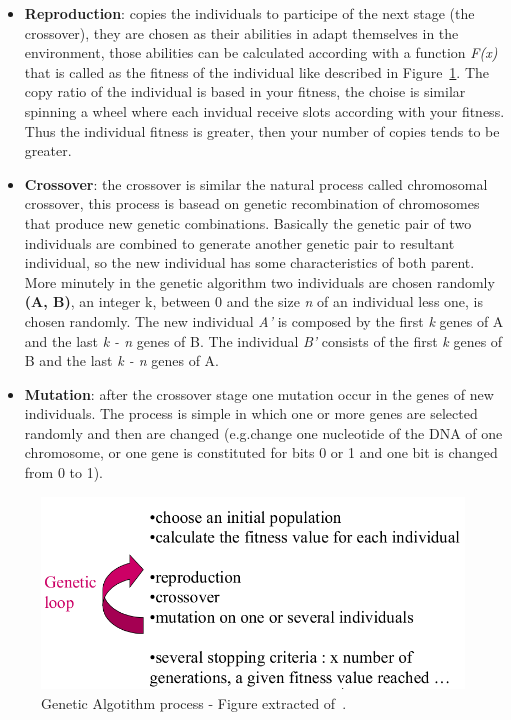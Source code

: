 \begin{itemize}
	\item \textbf{Reproduction}: copies the individuals to participe of the next
	stage (the crossover), they are chosen as their abilities in adapt themselves
	in the environment, those abilities can be calculated according with a function
	\textit{F(x)} that is called as the fitness of the individual like described
	in Figure~\ref{fig:ga}. The copy ratio of the individual is based in your fitness,
	the choise is similar spinning a wheel where each invidual receive slots according
	with your fitness. Thus the individual fitness is greater, then your number
	of copies tends to be greater.

	\item \textbf{Crossover}: the crossover is similar the natural process called
	chromosomal crossover, this process is basead on genetic recombination of
	chromosomes	that produce new genetic combinations. Basically the genetic pair
	of two individuals are combined to generate another genetic pair to resultant
	individual, so the new individual has some characteristics of both parent.
	More minutely in the genetic algorithm two individuals are chosen randomly {\bf(A, B)},
	an integer k, between 0 and the size {\it n} of an individual less one, is chosen
	randomly. The new individual {\it A'} is composed by the first {\it k} genes of A
	and the last {\it k - n} genes of B. The individual {\it B'} consists of the
	first {\it k} genes of B and the last {\it k - n} genes of A. 

	\item \textbf{Mutation}: after the crossover stage one mutation occur in the
	genes of new individuals. The process is simple in which one or more genes are
	selected randomly and then are changed (e.g.change one nucleotide of the DNA
	of one chromosome, or one gene is constituted for bits 0 or 1 and one bit is
	changed from 0 to 1).
\end{itemize}

\begin{figure}[htbp]
	\centering
	\includegraphics[width=\columnwidth]{img/ga.png}
	\caption{Genetic Algotithm process - Figure extracted of~\cite{baudry}.}\label{fig:ga}
\end{figure}


